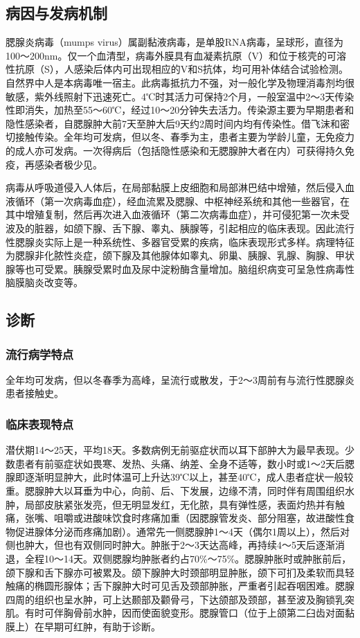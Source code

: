 \subsection{病因与发病机制}

腮腺炎病毒（mumps
virus）属副黏液病毒，是单股RNA病毒，呈球形，直径为100～200nm。仅一个血清型，病毒外膜具有血凝素抗原（V）和位于核壳的可溶性抗原（S），人感染后体内可出现相应的V和S抗体，均可用补体结合试验检测。自然界中人是本病毒唯一宿主。此病毒抵抗力不强，对一般化学及物理消毒剂均很敏感，紫外线照射下迅速死亡。4℃时其活力可保持2个月，一般室温中2～3天传染性即消失，加热至55～60℃，经过10～20分钟失去活力。传染源主要为早期患者和隐性感染者，自腮腺肿大前7天至肿大后9天约2周时间内均有传染性。借飞沫和密切接触传染。全年均可发病，但以冬、春季为主，患者主要为学龄儿童，无免疫力的成人亦可发病。一次得病后（包括隐性感染和无腮腺肿大者在内）可获得持久免疫，再感染者极少见。

病毒从呼吸道侵入人体后，在局部黏膜上皮细胞和局部淋巴结中增殖，然后侵入血液循环（第一次病毒血症），经血流累及腮腺、中枢神经系统和其他一些器官，在其中增殖复制，然后再次进入血液循环（第二次病毒血症），并可侵犯第一次未受波及的脏器，如颌下腺、舌下腺、睾丸、胰腺等，引起相应的临床表现。因此流行性腮腺炎实际上是一种系统性、多器官受累的疾病，临床表现形式多样。病理特征为腮腺非化脓性炎症，颌下腺及其他腺体如睾丸、卵巢、胰腺、乳腺、胸腺、甲状腺等也可受累。胰腺受累时血及尿中淀粉酶含量增加。脑组织病变可呈急性病毒性脑膜脑炎改变等。

\subsection{诊断}

\subsubsection{流行病学特点}

全年均可发病，但以冬春季为高峰，呈流行或散发，于2～3周前有与流行性腮腺炎患者接触史。

\subsubsection{临床表现特点}

潜伏期14～25天，平均18天。多数病例无前驱症状而以耳下部肿大为最早表现。少数患者有前驱症状如畏寒、发热、头痛、纳差、全身不适等，数小时或1～2天后腮腺即逐渐明显肿大，此时体温可上升达39℃以上，甚至40℃，成人患者症状一般较重。腮腺肿大以耳垂为中心，向前、后、下发展，边缘不清，同时伴有周围组织水肿，局部皮肤紧张发亮，但无明显发红，无化脓，具有弹性感，表面灼热并有触痛，张嘴、咀嚼或进酸味饮食时疼痛加重（因腮腺管发炎、部分阻塞，故进酸性食物促进腺体分泌而疼痛加剧）。通常先一侧腮腺肿1～4天（偶尔1周以上），然后对侧也肿大，但也有双侧同时肿大。肿胀于2～3天达高峰，再持续4～5天后逐渐消退，全程10～14天。双侧腮腺均肿胀者约占70\%～75\%。腮腺肿胀时或肿胀前后，颌下腺和舌下腺亦可被累及。颌下腺肿大时颈部明显肿胀，颌下可扪及柔软而具轻触痛的椭圆形腺体；舌下腺肿大时可见舌及颈部肿胀，严重者引起吞咽困难。腮腺四周的组织也呈水肿，可上达颞部及颧骨弓，下达颌部及颈部，甚至波及胸锁乳突肌。有时可伴胸骨前水肿，因而使面貌变形。腮腺管口（位于上颌第二臼齿对面黏膜上）在早期可红肿，有助于诊断。

